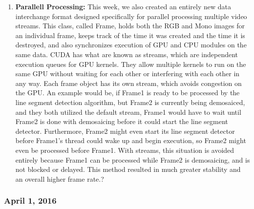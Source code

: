 \begin{enumerate}[leftmargin=2cm,labelindent=2cm]
\item \textbf{Parallell Processing:} 
This week, we also created an entirely new data interchange format designed specifically for parallel processing multiple video streams. This class, called Frame, holds both the RGB and Mono images for an individual frame, keeps track of the time it was created and the time it is destroyed, and also synchronizes execution of GPU and CPU modules on the same data. CUDA has what are known as streams, which are independent execution queues for GPU kernels. They allow multiple kernels to run on the same GPU without waiting for each other or interfering with each other in any way. Each frame object has its own stream, which avoids congestion on the GPU. An example would be, if Frame1 is ready to be processed by the line segment detection algorithm, but Frame2 is currently being demosaiced, and they both utilized the default stream, Frame1 would have to wait until Frame2 is done with demosaicing before it could start the line segment detector. Furthermore, Frame2 might even start its line segment detector before Frame1's thread could wake up and begin execution, so Frame2 might even be processed before Frame1. With streams, this situation is avoided entirely because Frame1 can be processed while Frame2 is demosaicing, and is not blocked or delayed. This method resulted in much greater stability and an overall higher frame rate.?\\
\end{enumerate}

\subsubsection{April 1, 2016}
